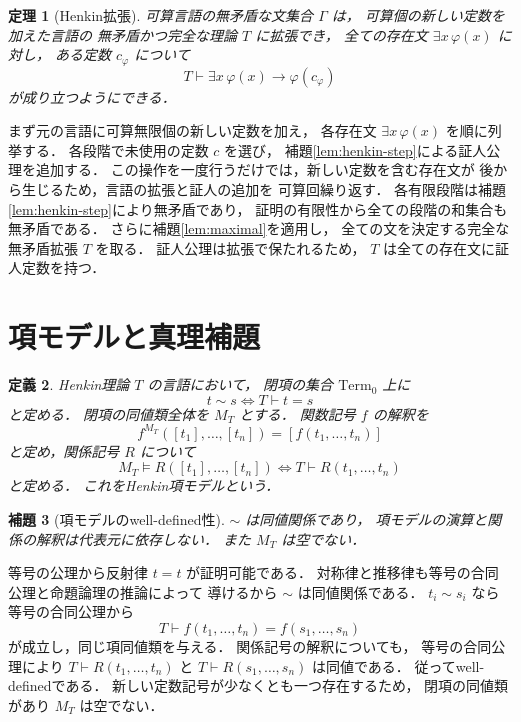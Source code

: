 \documentclass[a5paper,10pt,onecolumn]{jsarticle}
\makeatletter
\theoremstyle{mathnotetheorem}
\newtheorem{theorem}{定理}[section]
\newtheorem{definition}[theorem]{定義}
\newtheorem{lemma}[theorem]{補題}
\renewcommand{\proofname}{証明}
\renewenvironment{proof}[1][\proofname]{%
  \par\pushQED{\qed}\normalfont\topsep4\p@\@plus2\p@\relax
  \trivlist\item[\hskip\labelsep\bfseries #1]\ignorespaces
}{\popQED\endtrivlist\@endpefalse}
\makeatother
\begin{document}
\begin{theorem}[Henkin拡張]\label{thm:henkin}
可算言語の無矛盾な文集合 $\Gamma$ は，
可算個の新しい定数を加えた言語の
無矛盾かつ完全な理論 $T$ に拡張でき，
全ての存在文 $\exists x\,\varphi(x)$ に対し，
ある定数 $c_\varphi$ について
\[
 T\vdash\exists x\,\varphi(x)\to\varphi(c_\varphi)
\]
が成り立つようにできる．
\end{theorem}
\begin{proof}
まず元の言語に可算無限個の新しい定数を加え，
各存在文 $\exists x\,\varphi(x)$ を順に列挙する．
各段階で未使用の定数 $c$ を選び，
補題\ref{lem:henkin-step}による証人公理を追加する．
この操作を一度行うだけでは，新しい定数を含む存在文が
後から生じるため，言語の拡張と証人の追加を
可算回繰り返す．
各有限段階は補題\ref{lem:henkin-step}により無矛盾であり，
証明の有限性から全ての段階の和集合も無矛盾である．
さらに補題\ref{lem:maximal}を適用し，
全ての文を決定する完全な無矛盾拡張 $T$ を取る．
証人公理は拡張で保たれるため，
$T$ は全ての存在文に証人定数を持つ．
\end{proof}

\section{項モデルと真理補題}

\begin{definition}
Henkin理論 $T$ の言語において，
閉項の集合 $\mathrm{Term}_0$ 上に
\[
 t\sim s\iff T\vdash t=s
\]
と定める．
閉項の同値類全体を $M_T$ とする．
関数記号 $f$ の解釈を
\[
 f^{M_T}([t_1],\dots,[t_n])
 =[f(t_1,\dots,t_n)]
\]
と定め，関係記号 $R$ について
\[
 M_T\models R([t_1],\dots,[t_n])
 \iff T\vdash R(t_1,\dots,t_n)
\]
と定める．
これを\emph{Henkin項モデル}という．
\end{definition}

\begin{lemma}[項モデルのwell-defined性]\label{lem:term-model}
$\sim$ は同値関係であり，
項モデルの演算と関係の解釈は代表元に依存しない．
また $M_T$ は空でない．
\end{lemma}
\begin{proof}
等号の公理から反射律 $t=t$ が証明可能である．
対称律と推移律も等号の合同公理と命題論理の推論によって
導けるから $\sim$ は同値関係である．
$t_i\sim s_i$ なら等号の合同公理から
\[
 T\vdash f(t_1,\dots,t_n)=f(s_1,\dots,s_n)
\]
が成立し，同じ項同値類を与える．
関係記号の解釈についても，
等号の合同公理により
$T\vdash R(t_1,\dots,t_n)$ と
$T\vdash R(s_1,\dots,s_n)$ は同値である．
従ってwell-definedである．
新しい定数記号が少なくとも一つ存在するため，
閉項の同値類があり $M_T$ は空でない．
\end{proof}
\end{document}
